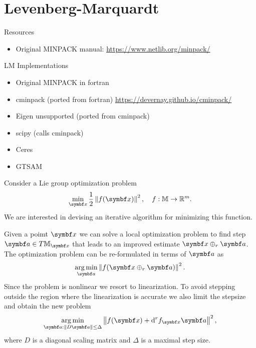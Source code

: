 \section{Levenberg-Marquardt}

Resources
\begin{itemize}
  \item Original MINPACK manual: \url{https://www.netlib.org/minpack/}
\end{itemize}

LM Implementations
\begin{itemize}
  \item Original MINPACK in fortran
  \item cminpack (ported from fortran) \url{https://devernay.github.io/cminpack/}
  \item Eigen unsupported (ported from cminpack)
  \item scipy (calls cminpack)
  \item Ceres
  \item GTSAM
\end{itemize}


Consider a Lie group optimization problem
\begin{equation}
  \min_\x \frac{1}{2} \left\| f(\x) \right\|^2, \quad f : \M \rightarrow \mathbb{R}^m.
\end{equation}
We are interested in devising an iterative algorithm for minimizing this function.

Given a poimt $\x$ we can solve a local optimization problem to find step $\a \in T \M _\x$ that leads to an improved estimate $\x \oplus_r \a$. The optimization problem can be re-formulated in terms of $\a$ as
\begin{equation}
  \argmin_{\a} \left\| f(\x \oplus_r \a) \right\|^2.
\end{equation}
Since the problem is nonlinear we resort to linearization. To avoid stepping outside the region where the linearization is accurate we also limit the stepsize and obtain the new problem
\begin{equation}
  \label{eq:lm_minimize_trust}
  \argmin_{\a : \| D \a \| \leq \Delta}\left\| f(\x) + \mathrm{d}^r f_\x \a \right \|^2,
\end{equation}
where $D$ is a diagonal scaling matrix and $\Delta$ is a maximal step size.

